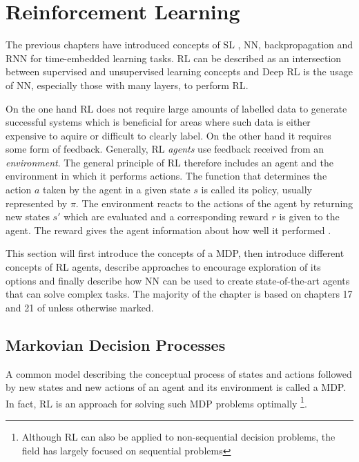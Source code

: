 \section{Reinforcement Learning}

The previous chapters have introduced concepts of \ac {SL} , \ac {NN}, backpropagation and \ac {RNN} for time-embedded
learning tasks. \ac {RL} can be described as an intersection between supervised and unsupervised learning concepts and
Deep \ac {RL} is the usage of \ac {NN}, especially those with many layers, to perform \ac {RL}.

On the one hand \ac {RL}  does not require large amounts of labelled data to generate successful systems which is
beneficial for areas where such data is either expensive to aquire or difficult to clearly label. On the other hand it
requires some form of feedback. Generally, \ac {RL} \emph{agents} use feedback received from an \emph{environment}.  The
general principle of \ac {RL} therefore includes an agent and the environment in which it performs actions. The function
that determines the action $a$  taken by the agent in a given state $s$ is called its policy, usually represented by
$\pi$.  The environment reacts to the actions of the agent by returning new states $s'$ which are evaluated and a
corresponding reward $r$ is given to the agent. The reward gives the agent information about how well it performed 
\citep[p.830f.]{russell2016artificial}.

This section will first introduce the concepts of a \ac {MDP}, then introduce different concepts of \ac {RL} agents,
describe approaches to encourage exploration of its options and finally describe how \ac {NN} can be used to create
state-of-the-art agents that can solve complex tasks. The majority of the chapter is based on
chapters 17 and 21 of \citet[]{russell2016artificial} unless otherwise marked. 

\subsection{Markovian Decision Processes}%
\label{ssub:markovian_decision_processes}

A common model describing the conceptual process of states and actions followed by new states and new actions of an
agent and its environment is called a \acf {MDP}. In fact, \ac {RL} is an approach for solving such \ac {MDP} problems
optimally
\footnote{Although \ac {RL} can also be applied to non-sequential decision problems, the field has largely focused on
sequential problems}.

